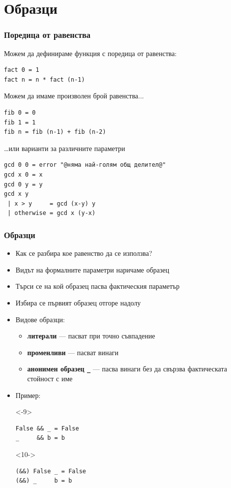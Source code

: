 \documentclass[alsotrans,beameroptions={aspectratio=169}]{beamerswitch}
\begin{document}
\section{Образци}

\begin{frame}[fragile]
  \frametitle{Поредица от равенства}

  \sizeboth\small
  Можем да дефинираме функция с поредица от равенства:
\begin{lstlisting}
fact 0 = 1
fact n = n * fact (n-1)
\end{lstlisting}
  \pause
  Можем да имаме произволен брой равенства...
\begin{lstlisting}
fib 0 = 0
fib 1 = 1
fib n = fib (n-1) + fib (n-2)
\end{lstlisting}
  \pause
  \ldots или варианти за различните параметри
\begin{lstlisting}
gcd 0 0 = error "@няма най-голям общ делител@"
gcd x 0 = x
gcd 0 y = y
gcd x y
 | x > y     = gcd (x-y) y
 | otherwise = gcd x (y-x)
\end{lstlisting}
\end{frame}

\begin{frame}[fragile]
  \frametitle{Образци}

  \begin{itemize}[<+->]
  \item Как се разбира кое равенство да се използва?
  \item Видът на формалните параметри наричаме \alert{образец}
  \item Търси се на кой образец пасва фактическия параметър
  \item Избира се първият образец \alert{отгоре надолу}
  \item Видове образци:
    \begin{itemize}
    \item \textbf{литерали} --- пасват при точно съвпадение
    \item \textbf{променливи} --- пасват винаги
    \item \textbf{анонимен образец \tt\_} ---  пасва винаги без да свързва фактическата стойност с име
    \end{itemize}
  \item Пример:
    \begin{onlyenv}<-9>
\begin{lstlisting}
False && _ = False
_     && b = b
\end{lstlisting}
    \end{onlyenv}
    \begin{onlyenv}<10->
\begin{lstlisting}
(&&) False _ = False
(&&) _     b = b
\end{lstlisting}
    \end{onlyenv}
  \end{itemize}
\end{frame}
\end{document}
